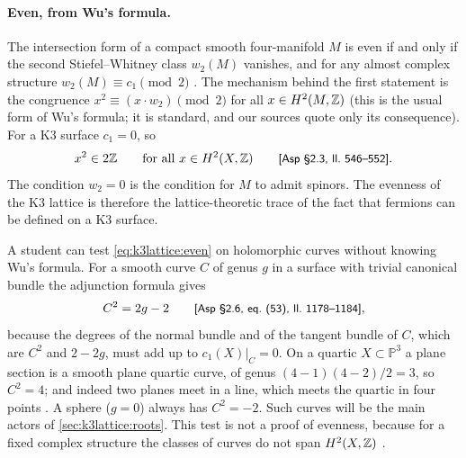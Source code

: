 \paragraph{Even, from Wu's formula.}
The intersection form of a compact smooth four-manifold $M$ is even if and only if the second
Stiefel--Whitney class $w_2(M)$ vanishes, and for any almost complex structure
$w_2(M)\equiv c_1\pmod 2$ . The mechanism
behind the first statement is the congruence $x^2\equiv(x\cdot w_2)\pmod2$ for all
$x\in H^2(M,\mathbb{Z})$ (this is the usual form of Wu's formula; it is standard, and our sources
quote only its consequence). For a K3 surface $c_1=0$, so
\begin{equation}\label{eq:k3lattice:even}
 x^2\in2\mathbb{Z}\qquad\text{for all }x\in H^2(X,\mathbb{Z})\qquad\text{{\small\textsf{[Asp §2.3, ll.~546--552]}}} .
\end{equation}
The condition $w_2=0$ is the condition for $M$ to admit spinors. The evenness of the K3
lattice is therefore the lattice-theoretic trace of the fact that fermions can be defined on
a K3 surface.

A student can test \eqref{eq:k3lattice:even} on holomorphic curves without knowing Wu's
formula. For a smooth curve $C$ of genus $g$ in a surface with trivial canonical bundle the
adjunction formula gives
\begin{equation}\label{eq:k3lattice:adjunction}
 C^2=2g-2\qquad\text{{\small\textsf{[Asp §2.6, eq.~(53), ll.~1178--1184]}}} ,
\end{equation}
because the degrees of the normal bundle and of the tangent bundle of $C$, which are $C^2$
and $2-2g$, must add up to $c_1(X)|_C=0$. On a quartic $X\subset\mathbb{P}^3$ a plane section
is a smooth plane quartic curve, of genus $(4-1)(4-2)/2=3$, so $C^2=4$; and indeed two planes
meet in a line, which meets the quartic in four points . A
sphere ($g=0$) always has $C^2=-2$. Such curves will be the main actors of
\cref{sec:k3lattice:roots}. This test is not a proof of evenness, because for a fixed complex
structure the classes of curves do not span $H^2(X,\mathbb{Z})$
.

